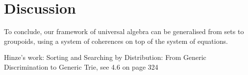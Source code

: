 \section{Discussion}
\label{sec:discussion}

To conclude, our framework of universal algebra can be generalised from sets to groupoids, using a system of
coherences on top of the system of equations.

Hinze's work: Sorting and Searching by Distribution: From Generic Discrimination to Generic Trie, see 4.6 on page 324
